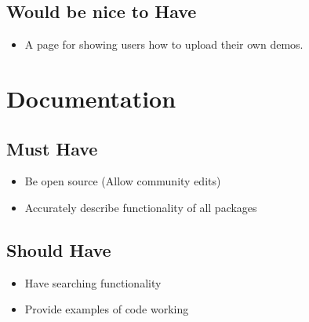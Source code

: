 \documentclass{l4proj}
\begin{document}
\begin{appendices}
\subsection{Would be nice to Have}
\begin{itemize}
    \item A page for showing users how to upload their own demos.
\end{itemize}


\section{Documentation}
\subsection{Must Have}
\begin{itemize}
    \item Be open source (Allow community edits)
    \item Accurately describe functionality of all packages
\end{itemize}
\subsection{Should Have}
\begin{itemize}
    \item Have searching functionality
    \item Provide examples of code working
\end{itemize}


\end{appendices}
\end{document}
